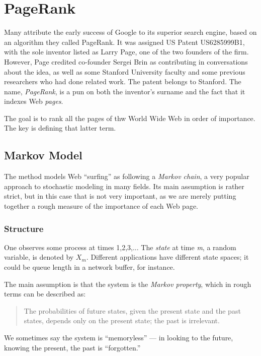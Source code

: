 \chapter{PageRank}  
\label{chap:page}

Many attribute the early success of Google to its superior search
engine, based on an algorithm they called PageRank.  It was assigned US
Patent US6285999B1, with the sole inventor listed as Larry Page, one of
the two founders of the firm.  However, Page credited co-founder Sergei
Brin as contributing in conversations about the idea, as well as some
Stanford University faculty and some previous researchers who had done
related work.  The patent belongs to Stanford.  The name,
\textit{PageRank}, is a pun on both the inventor's surname and the fact
that it indexes Web \textit{pages}.

The goal is to rank all the pages of thw World Wide Web in order of
importance.  The key is defining that latter term.

\section{Markov Model}

The method models Web ``surfing'' as following a \textit{Markov chain}, a
very popular approach to stochastic modeling in many fields.
Its main assumption is rather strict, but in this case that is not very
important, as we are merely putting together a rough measure of the
importance of each Web page.

\subsection{Structure}

One observes some process at times 1,2,3,...  The \textit{state} at time
\textit{m}, a random variable, is denoted by $X_m$.  Different
applications have different state spaces; it could be queue length in a
network buffer, for instance.

The main assumption is that the system is the \textit{Markov property},
which in rough terms can be described as:

\begin{quote}
The probabilities of future states, given the present state and the past
states, depends only on the present state; the past is irrelevant.
\end{quote}

We sometimes say the system is ``memoryless'' --- in looking to the
future, knowing the present, the past is ``forgotten.''

